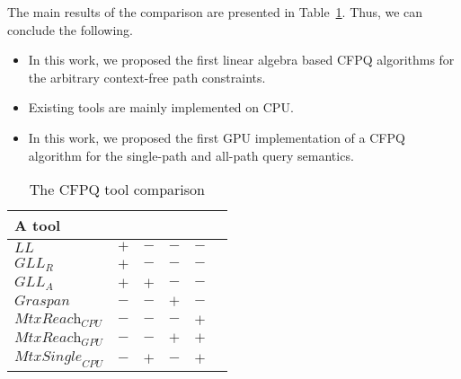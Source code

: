 The main results of the comparison are presented in Table~\ref{tab:comparison}. Thus, we can conclude the following.

\begin{itemize}
    \item In this work, we proposed the first linear algebra based CFPQ algorithms for the arbitrary context-free path constraints.
    \item Existing tools are mainly implemented on CPU.
    \item In this work, we proposed the first GPU implementation of a CFPQ algorithm for the single-path and all-path query semantics.
\end{itemize}

\begin{table} [h]
  \centering
\begin{threeparttable}
  \caption{The CFPQ tool comparison}\label{tab:comparison}
  \begin{tabular}{| p{3.5cm} || p{3.2cm} | p{2.6cm} | p{2.6cm} | p{2.4cm}l |}
  \hline                               
  \hline
  {A tool}              &\centering {Without transformations}        &\centering {Path extraction}    &\centering {GPU} &\centering {Linear algebra}  & \\
  \hline
  $\textit{LL}$                         &\centering  $+$                  &\centering  $-$             &\centering  $-$   &\centering  $-$  &\\
  $\textit{GLL}_{\textit{R}}$                &\centering  $+$                  &\centering  $-$              &\centering  $-$   &\centering  $-$    & \\
  $\textit{GLL}_{\textit{A}}$                &\centering  $+$                  &\centering  $+$\tnote{*}              &\centering  $-$   &\centering  $-$    & \\
  $\textit{Graspan}$                       &\centering  $-$\tnote{**}                   &\centering  $-$             &\centering  $+$\tnote{***} &\centering  $-$       &\\
  $\textit{MtxReach}_{\textit{CPU}}$                           &\centering  $-$                  &\centering  $-$             &\centering  $-$  &\centering  $+$   &\\
  $\textit{MtxReach}_{\textit{GPU}}$                          &\centering  $-$                  &\centering  $-$             &\centering  $+$  &\centering  $+$   &\\
  $\textit{MtxSingle}_{\textit{CPU}}$                           &\centering  $-$                  &\centering  $+$             &\centering  $-$\tnote{****}  &\centering  $+$   &\\

\end{tabular}
\end{threeparttable}
\end{table}
